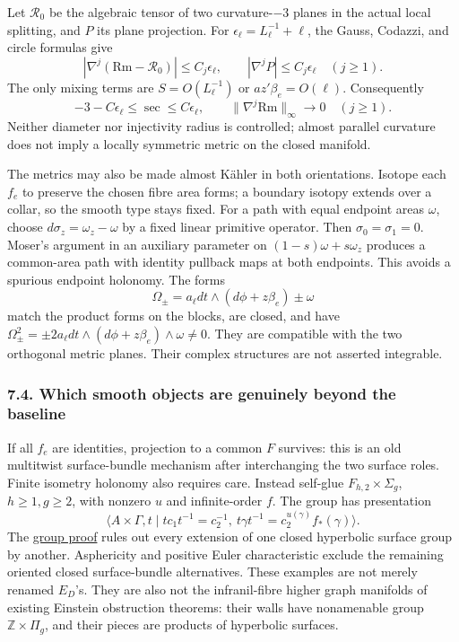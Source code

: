 \documentclass[
  english,
]{article}
\begin{document}
Let \(\mathcal R_0\) be the algebraic tensor of two curvature-\(-3\)
planes in the actual local splitting, and \(P\) its plane projection.
For \(\epsilon_\ell=L_\ell^{-1}+\ell\), the Gauss, Codazzi, and circle
formulas give \[
|\nabla^j(\mathrm{Rm}-\mathcal R_0)|\le C_j\epsilon_\ell,\qquad
|\nabla^jP|\le C_j\epsilon_\ell\quad(j\ge1).
\] The only mixing terms are \(S=O(L_\ell^{-1})\) or
\(az'\beta_e=O(\ell)\). Consequently \[
-3-C\epsilon_\ell\le\sec\le C\epsilon_\ell,\qquad
\|\nabla^j\mathrm{Rm}\|_\infty\to0\quad(j\ge1).
\tag{7.5}
\] Neither diameter nor injectivity radius is controlled; almost
parallel curvature does not imply a locally symmetric metric on the
closed manifold.

The metrics may also be made almost Kähler in both orientations. Isotope
each \(f_e\) to preserve the chosen fibre area forms; a boundary isotopy
extends over a collar, so the smooth type stays fixed. For a path with
equal endpoint areas \(\omega\), choose \(d\sigma_z=\omega_z-\omega\) by
a fixed linear primitive operator. Then \(\sigma_0=\sigma_1=0\). Moser's
argument in an auxiliary parameter on \((1-s)\omega+s\omega_z\) produces
a common-area path with identity pullback maps at both endpoints. This
avoids a spurious endpoint holonomy. The forms \[
\Omega_\pm=a_\ell dt\wedge(d\phi+z\beta_e)\pm\omega
\] match the product forms on the blocks, are closed, and have
\(\Omega_\pm^2=\pm2a_\ell dt\wedge(d\phi+z\beta_e)\wedge\omega\ne0\).
They are compatible with the two orthogonal metric planes. Their complex
structures are not asserted integrable.

\hypertarget{which-smooth-objects-are-genuinely-beyond-the-baseline}{%
\subsubsection{7.4. Which smooth objects are genuinely beyond the
baseline}\label{which-smooth-objects-are-genuinely-beyond-the-baseline}}

If all \(f_e\) are identities, projection to a common \(F\) survives:
this is an old multitwist surface-bundle mechanism after interchanging
the two surface roles. Finite isometry holonomy also requires care.
Instead self-glue \(F_{h,2}\times\Sigma_g\), \(h\ge1,g\ge2\), with
nonzero \(u\) and infinite-order \(f\). The group has presentation \[
\langle A\times\Gamma,t\mid tc_1t^{-1}=c_2^{-1},\
t\gamma t^{-1}=c_2^{u(\gamma)}f_*(\gamma)\rangle .
\] The \href{../proofs/round11_graph_topology.md}{group proof} rules out
every extension of one closed hyperbolic surface group by another.
Asphericity and positive Euler characteristic exclude the remaining
oriented closed surface-bundle alternatives. These examples are not
merely renamed \(E_D\)'s. They are also not the infranil-fibre higher
graph manifolds of existing Einstein obstruction theorems: their walls
have nonamenable group \(\mathbb Z\times\Pi_g\), and their pieces are
products of hyperbolic surfaces.
\end{document}
